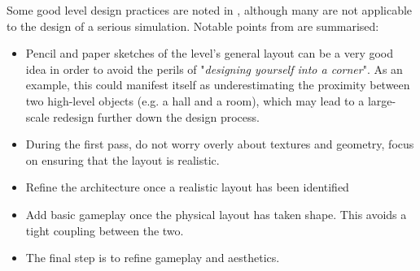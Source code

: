 Some good level design practices are noted in \cite{Rouse2005GamePractice}, although many are not applicable to the design of a serious simulation. Notable points from \cite{Rouse2005GamePractice} are summarised:
\begin{itemize}
    \item Pencil and paper sketches of the level's general layout can be a very good idea in order to avoid the perils of "\textit{designing yourself into a corner}". As an example, this could manifest itself as underestimating the proximity between two high-level objects (e.g. a hall and a room), which may lead to a large-scale redesign further down the design process.
    \item During the first pass, do not worry overly about textures and geometry, focus on ensuring that the layout is realistic.
    \item Refine the architecture once a realistic layout has been identified
    \item Add basic gameplay once the physical layout has taken shape. This avoids a tight coupling between the two.
    \item The final step is to refine gameplay and aesthetics.
\end{itemize}

